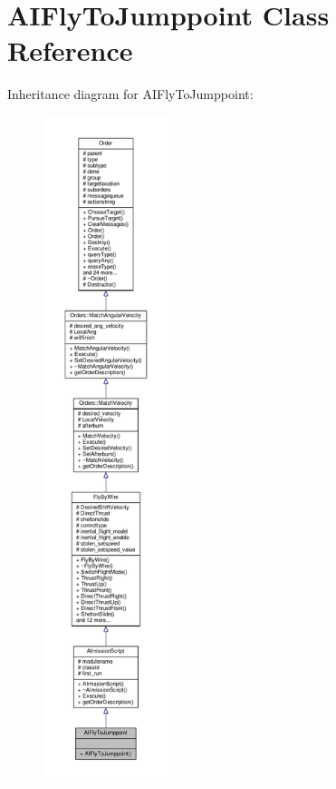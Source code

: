 \hypertarget{classAIFlyToJumppoint}{}\section{A\+I\+Fly\+To\+Jumppoint Class Reference}
\label{classAIFlyToJumppoint}


Inheritance diagram for A\+I\+Fly\+To\+Jumppoint\+:
\nopagebreak
\begin{figure}[H]
\begin{center}
\leavevmode
\includegraphics[height=550pt]{d0/dfb/classAIFlyToJumppoint__inherit__graph}
\end{center}
\end{figure}


